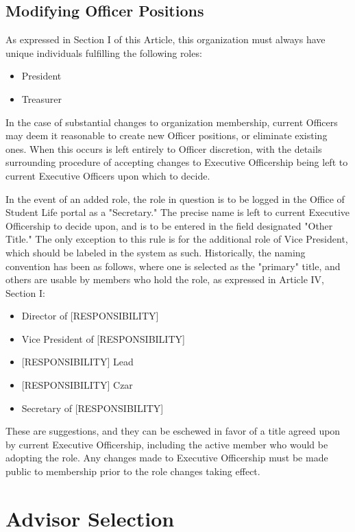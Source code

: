 \documentclass[12pt,letterpaper]{article}
\begin{document}
\subsection{Modifying Officer Positions}

As expressed in Section I of this Article, this organization must always have unique
individuals fulfilling the following roles:

\begin{itemize}
  \item President
  \item Treasurer
\end{itemize}

In the case of substantial changes to organization membership, current Officers may deem
it reasonable to create new Officer positions, or eliminate existing ones. When this
occurs is left entirely to Officer discretion, with the details surrounding procedure of
accepting changes to Executive Officership being left to current Executive Officers upon
which to decide.

In the event of an added role, the role in question is to be logged in the Office of
Student Life portal as a "Secretary." The precise name is left to current Executive
Officership to decide upon, and is to be entered in the field designated "Other Title."
The only exception to this rule is for the additional role of Vice President, which
should be labeled in the system as such. Historically, the naming convention has been as
follows, where one is selected as the "primary" title, and others are usable by members
who hold the role, as expressed in Article IV, Section I:

\begin{itemize}
  \item Director of [RESPONSIBILITY]
  \item Vice President of [RESPONSIBILITY]
  \item {[RESPONSIBILITY]} Lead
  \item {[RESPONSIBILITY]} Czar
  \item Secretary of [RESPONSIBILITY]
\end{itemize}

These are suggestions, and they can be eschewed in favor of a title agreed upon by current Executive Officership, including the active member who would be adopting the role. Any changes made to Executive Officership must be made public to membership prior to the role changes taking effect.

\section{Advisor Selection}
\end{document}
